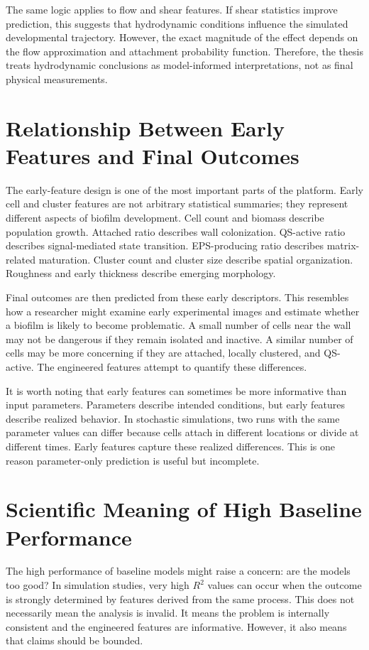 \documentclass[12pt,a4paper,oneside]{report}
\begin{document}
The same logic applies to flow and shear features. If shear statistics improve prediction, this suggests that hydrodynamic conditions influence the simulated developmental trajectory. However, the exact magnitude of the effect depends on the flow approximation and attachment probability function. Therefore, the thesis treats hydrodynamic conclusions as model-informed interpretations, not as final physical measurements.

\section{Relationship Between Early Features and Final Outcomes}
The early-feature design is one of the most important parts of the platform. Early cell and cluster features are not arbitrary statistical summaries; they represent different aspects of biofilm development. Cell count and biomass describe population growth. Attached ratio describes wall colonization. QS-active ratio describes signal-mediated state transition. EPS-producing ratio describes matrix-related maturation. Cluster count and cluster size describe spatial organization. Roughness and early thickness describe emerging morphology.

Final outcomes are then predicted from these early descriptors. This resembles how a researcher might examine early experimental images and estimate whether a biofilm is likely to become problematic. A small number of cells near the wall may not be dangerous if they remain isolated and inactive. A similar number of cells may be more concerning if they are attached, locally clustered, and QS-active. The engineered features attempt to quantify these differences.

It is worth noting that early features can sometimes be more informative than input parameters. Parameters describe intended conditions, but early features describe realized behavior. In stochastic simulations, two runs with the same parameter values can differ because cells attach in different locations or divide at different times. Early features capture these realized differences. This is one reason parameter-only prediction is useful but incomplete.

\section{Scientific Meaning of High Baseline Performance}
The high performance of baseline models might raise a concern: are the models too good? In simulation studies, very high \(R^2\) values can occur when the outcome is strongly determined by features derived from the same process. This does not necessarily mean the analysis is invalid. It means the problem is internally consistent and the engineered features are informative. However, it also means that claims should be bounded.
\end{document}
